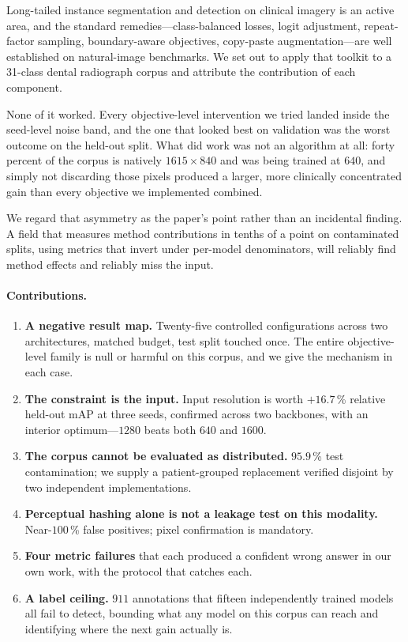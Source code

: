 \documentclass[10pt,twocolumn,letterpaper]{article}
\begin{document}
Long-tailed instance segmentation and detection on clinical imagery is an active
area, and the standard remedies---class-balanced losses, logit adjustment,
repeat-factor sampling, boundary-aware objectives, copy-paste
augmentation---are well established on natural-image benchmarks. We set out to
apply that toolkit to a 31-class dental radiograph corpus and attribute the
contribution of each component.

None of it worked. Every objective-level intervention we tried landed inside the
seed-level noise band, and the one that looked best on validation was the worst
outcome on the held-out split. What did work was not an algorithm at all: forty
percent of the corpus is natively $1615\times840$ and was being trained at $640$,
and simply not discarding those pixels produced a larger, more clinically
concentrated gain than every objective we implemented combined.

We regard that asymmetry as the paper's point rather than an incidental finding.
A field that measures method contributions in tenths of a point on contaminated
splits, using metrics that invert under per-model denominators, will reliably
find method effects and reliably miss the input.

\paragraph{Contributions.}
\begin{enumerate}\itemsep2pt
\item \textbf{A negative result map.} Twenty-five controlled configurations
across two architectures, matched budget, test split touched once. The entire
objective-level family is null or harmful on this corpus, and we give the
mechanism in each case.
\item \textbf{The constraint is the input.} Input resolution is worth
$+16.7$\,\% relative held-out mAP at three seeds, confirmed across two backbones,
with an interior optimum---$1280$ beats both $640$ and $1600$.
\item \textbf{The corpus cannot be evaluated as distributed.} $95.9$\,\% test
contamination; we supply a patient-grouped replacement verified disjoint by two
independent implementations.
\item \textbf{Perceptual hashing alone is not a leakage test on this modality.}
Near-$100$\,\% false positives; pixel confirmation is mandatory.
\item \textbf{Four metric failures} that each produced a confident wrong answer
in our own work, with the protocol that catches each.
\item \textbf{A label ceiling.} $911$ annotations that fifteen independently
trained models all fail to detect, bounding what any model on this corpus can
reach and identifying where the next gain actually is.
\end{enumerate}
\end{document}
